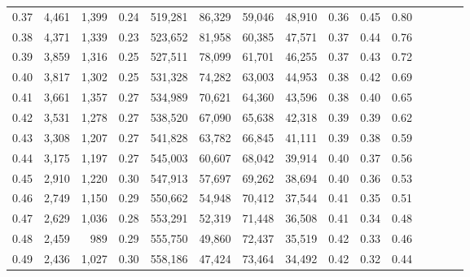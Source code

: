 \begin{tabular}{rrrcrrrrrrrrrrr}
0.37 &   4,461 &  1,399 &                                       0.24 &  519,281 &   86,329 &   59,046 &   48,910 &  0.36 &  0.45 &                         0.80 \\
0.38 &   4,371 &  1,339 &                                       0.23 &  523,652 &   81,958 &   60,385 &   47,571 &  0.37 &  0.44 &                         0.76 \\
0.39 &   3,859 &  1,316 &                                       0.25 &  527,511 &   78,099 &   61,701 &   46,255 &  0.37 &  0.43 &                         0.72 \\
0.40 &   3,817 &  1,302 &                                       0.25 &  531,328 &   74,282 &   63,003 &   44,953 &  0.38 &  0.42 &                         0.69 \\
0.41 &   3,661 &  1,357 &                                       0.27 &  534,989 &   70,621 &   64,360 &   43,596 &  0.38 &  0.40 &                         0.65 \\
0.42 &   3,531 &  1,278 &                                       0.27 &  538,520 &   67,090 &   65,638 &   42,318 &  0.39 &  0.39 &                         0.62 \\
0.43 &   3,308 &  1,207 &                                       0.27 &  541,828 &   63,782 &   66,845 &   41,111 &  0.39 &  0.38 &                         0.59 \\
0.44 &   3,175 &  1,197 &                                       0.27 &  545,003 &   60,607 &   68,042 &   39,914 &  0.40 &  0.37 &                         0.56 \\
0.45 &   2,910 &  1,220 &                                       0.30 &  547,913 &   57,697 &   69,262 &   38,694 &  0.40 &  0.36 &                         0.53 \\
0.46 &   2,749 &  1,150 &                                       0.29 &  550,662 &   54,948 &   70,412 &   37,544 &  0.41 &  0.35 &                         0.51 \\
0.47 &   2,629 &  1,036 &                                       0.28 &  553,291 &   52,319 &   71,448 &   36,508 &  0.41 &  0.34 &                         0.48 \\
0.48 &   2,459 &    989 &                                       0.29 &  555,750 &   49,860 &   72,437 &   35,519 &  0.42 &  0.33 &                         0.46 \\
0.49 &   2,436 &  1,027 &                                       0.30 &  558,186 &   47,424 &   73,464 &   34,492 &  0.42 &  0.32 &                         0.44 \\

\end{tabular}
